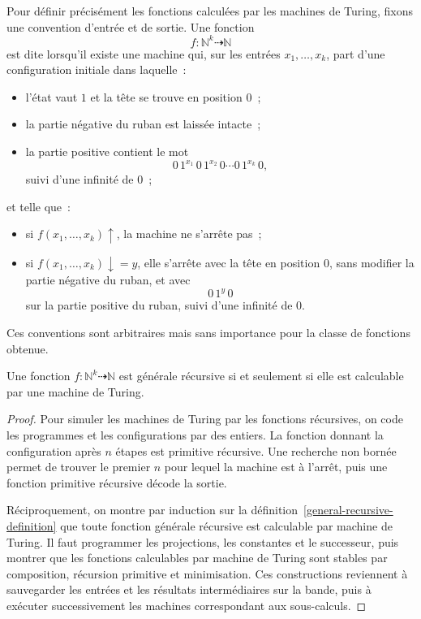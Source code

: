\thingy Pour définir précisément les fonctions calculées par les
machines de Turing, fixons une convention d'entrée et de sortie.  Une
fonction
\[
f\colon\mathbb{N}^k\dasharrow\mathbb{N}
\]
est dite  lorsqu'il existe une machine qui, sur les entrées
$x_1,\ldots,x_k$, part d'une configuration initiale dans laquelle :
\begin{itemize}
\item l'état vaut $1$ et la tête se trouve en position $0$ ;
\item la partie négative du ruban est laissée intacte ;
\item la partie positive contient le mot
\[
0\,1^{x_1}\,0\,1^{x_2}\,0\cdots0\,1^{x_k}\,0,
\]
suivi d'une infinité de $0$ ;
\end{itemize}
et telle que :
\begin{itemize}
\item si $f(x_1,\ldots,x_k)\uparrow$, la machine ne s'arrête pas ;
\item si $f(x_1,\ldots,x_k)\downarrow=y$, elle s'arrête avec la tête en
  position $0$, sans modifier la partie négative du ruban, et avec
  \[
  0\,1^y\,0
  \]
  sur la partie positive du ruban, suivi d'une infinité de $0$.
\end{itemize}

Ces conventions sont arbitraires mais sans importance pour la classe
de fonctions obtenue.

\begin{thm}\label{recursive-functions-turing-machines}
Une fonction
$f\colon\mathbb{N}^k\dasharrow\mathbb{N}$ est générale récursive si et
seulement si elle est calculable par une machine de Turing.
\end{thm}

\begin{proof}
Pour simuler les machines de Turing par les fonctions récursives, on
code les programmes et les configurations par des entiers.  La
fonction donnant la configuration après $n$ étapes est primitive
récursive.  Une recherche non bornée permet de trouver le premier
$n$ pour lequel la machine est à l'arrêt, puis une fonction primitive
récursive décode la sortie.

Réciproquement, on montre par induction sur la
définition \ref{general-recursive-definition} que toute fonction
générale récursive est calculable par machine de Turing.  Il faut
programmer les projections, les constantes et le successeur, puis
montrer que les fonctions calculables par machine de Turing sont
stables par composition, récursion primitive et minimisation.  Ces
constructions reviennent à sauvegarder les entrées et les résultats
intermédiaires sur la bande, puis à exécuter successivement les
machines correspondant aux sous-calculs.
\end{proof}


